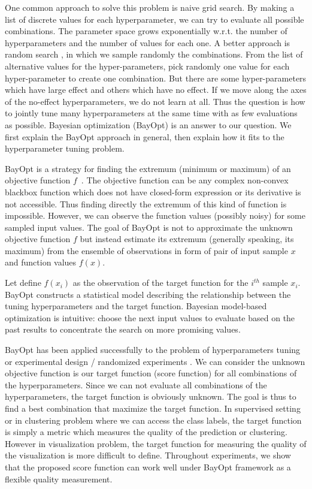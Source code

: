 One common approach to solve this problem is naive grid search.
By making a list of discrete values for each hyperparameter,
we can try to evaluate all possible combinations.
The parameter space grows exponentially w.r.t. the number of hyperparameters
and the number of values for each one.
A better approach is random search \cite{bergstra2011algorithms}, in which we sample randomly the combinations.
From the list of alternative values for the hyper-parameters,
pick randomly one value for each hyper-parameter to create one combination.
But there are some hyper-parameters which have large effect and others which have no effect.
If we move along the axes of the no-effect hyperparameters, we do not learn at all.
Thus the question is how to jointly tune many hyperparameters at the same time
with as few evaluations as possible.
Bayesian optimization (BayOpt) is an answer to our question.
We first explain the BayOpt approach in general, then explain how it fits to the hyperparameter tuning problem.

BayOpt is a strategy for finding the extremum (minimum or maximum) of an objective function $f$~\cite{mockus1975on}.
The objective function can be any complex non-convex blackbox function which does not have closed-form expression or its derivative is not accessible.
Thus finding directly the extremum of this kind of function is impossible.
However, we can observe the function values (possibly noisy) for some sampled input values.
The goal of BayOpt is not to approximate the unknown objective function $f$ but instead
estimate its extremum (generally speaking, its maximum) from the ensemble of observations
in form of pair of input sample $x$ and function values $f(x)$.

Let define $f(x_i)$ as the observation of the target function for the $i^{th}$ sample $x_i$.
BayOpt constructs a statistical model describing the relationship between
the tuning hyperparameters and the target function.
Bayesian model-based optimization is intuitive: choose the next input values to evaluate based on the past results to concentrate the search on more promising values.

BayOpt has been applied successfully to the problem of hyperparameters tuning \cite{snoek2012practical} or experimental design / randomized experiments \cite{letham2019constrained}.
We can consider the unknown objective function is our target function (score function) for all combinations of the hyperparameters.
Since we can not evaluate all combinations of the hyperparameters, the target function is obviously unknown.
The goal is thus to find a best combination that maximize the target function.
In supervised setting or in clustering problem where we can access the class labels, the target function is simply a metric which measures the quality of the prediction or clustering.
However in visualization problem, the target function for measuring the quality of the visualization is more difficult to define.
Throughout experiments, we show that the proposed score function can work well under BayOpt framework as a flexible quality measurement.


